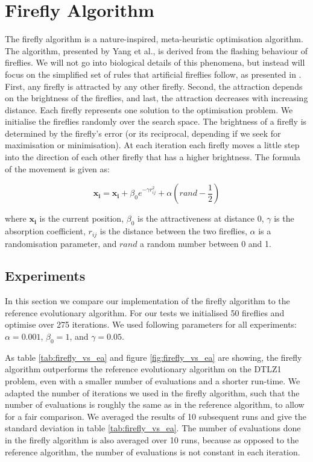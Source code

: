 \section{Firefly Algorithm}

The firefly algorithm is a nature-inspired, meta-heuristic optimisation
algorithm. The algorithm, presented by Yang et al., is derived from the
flashing behaviour of fireflies. We will not go into biological details of this
phenomena, but instead will focus on the simplified set of rules that
artificial fireflies follow, as presented in \cite{firefly}. First, any firefly
is attracted by any other firefly. Second, the attraction depends on the
brightness of the fireflies, and last, the attraction decreases with increasing
distance.  Each firefly represents one solution to the optimisation problem. We
initialise the fireflies randomly over the search space. The brightness of a
firefly is determined by the firefly's error (or its reciprocal, depending if
we seek for maximisation or minimisation). At each iteration each firefly
moves a little step into the direction of each other firefly that has a higher
brightness. The formula of the movement is given as:

\begin{equation}
    \mathbf{x_i} = \mathbf{x_i} + \beta_0 e^{-\gamma r_{ij}^2} + \alpha (rand - \frac{1}{2})
\end{equation}

where $\mathbf{x_i}$ is the current position, $\beta_0$ is the attractiveness
at distance 0, $\gamma$ is the absorption coefficient, $r_{ij}$ is the distance
between the two fireflies, $\alpha$ is a randomisation parameter, and $rand$ a
random number between 0 and 1.

\subsection{Experiments}

In this section we compare our implementation of the firefly algorithm to the
reference evolutionary algorithm. For our tests we initialised 50 fireflies and
optimise over 275 iterations. We used following parameters for all experiments:
$\alpha = 0.001$, $\beta_0 = 1$, and $\gamma = 0.05$.

As table \ref{tab:firefly_vs_ea} and figure \ref{fig:firefly_vs_ea} are
showing, the firefly algorithm outperforms the reference evolutionary algorithm
on the DTLZ1 problem, even with a smaller number of evaluations and a shorter
run-time. We adapted the number of iterations we used in the firefly algorithm,
such that the number of evaluations is roughly the same as in the reference
algorithm, to allow for a fair comparison. We averaged the results of 10
subsequent runs and give the standard deviation in table
\ref{tab:firefly_vs_ea}. The number of evaluations done in the firefly
algorithm is also averaged over 10 runs, because as opposed to the reference
algorithm, the number of evaluations is not constant in each iteration.

